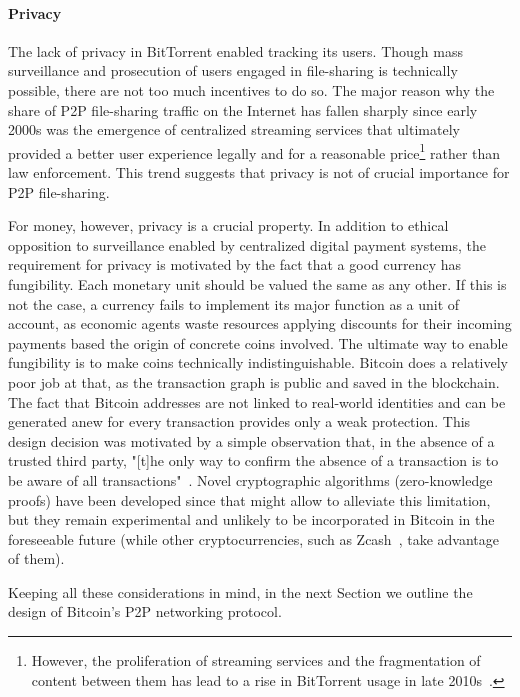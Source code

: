 \paragraph{Privacy}
The lack of privacy in BitTorrent enabled tracking its users.
Though mass surveillance and prosecution of users engaged in file-sharing is technically possible, there are not too much incentives to do so.
The major reason why the share of P2P file-sharing traffic on the Internet has fallen sharply since early 2000s was the emergence of centralized streaming services that ultimately provided a better user experience legally and for a reasonable price\footnote{However, the proliferation of streaming services and the fragmentation of content between them has lead to a rise in BitTorrent usage in late 2010s~\cite{Bode2018}.} rather than law enforcement.
This trend suggests that privacy is not of crucial importance for P2P file-sharing.

For money, however, privacy is a crucial property.
In addition to ethical opposition to surveillance enabled by centralized digital payment systems, the requirement for privacy is motivated by the fact that a good currency has fungibility.
Each monetary unit should be valued the same as any other.
If this is not the case, a currency fails to implement its major function as a unit of account, as economic agents waste resources applying discounts for their incoming payments based the origin of concrete coins involved.
The ultimate way to enable fungibility is to make coins technically indistinguishable.
Bitcoin does a relatively poor job at that, as the transaction graph is public and saved in the blockchain.
The fact that Bitcoin addresses are not linked to real-world identities and can be generated anew for every transaction provides only a weak protection.
This design decision was motivated by a simple observation that, in the absence of a trusted third party, "[t]he only way to confirm the absence of a transaction is to be aware of all transactions"~\cite{Nakamoto2008}.
Novel cryptographic algorithms (zero-knowledge proofs) have been developed since that might allow to alleviate this limitation, but they remain experimental and unlikely to be incorporated in Bitcoin in the foreseeable future (while other cryptocurrencies, such as Zcash~\cite{BenSasson2014}, take advantage of them).

Keeping all these considerations in mind, in the next Section we outline the design of Bitcoin's P2P networking protocol.



